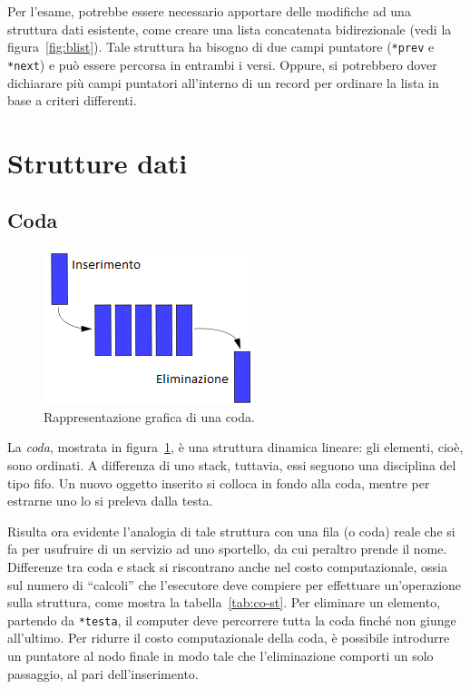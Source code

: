 Per l'esame, potrebbe essere necessario apportare delle modifiche ad una struttura dati esistente, come creare una lista concatenata bidirezionale (vedi la figura~\ref{fig:blist}).
Tale struttura ha bisogno di due campi puntatore (\lstinline!*prev! e \lstinline!*next!) e può essere percorsa in entrambi i versi.
Oppure, si potrebbero dover dichiarare più campi puntatori all'interno di un record per ordinare la lista in base a criteri differenti.

	\section{Strutture dati}

		\subsection{Coda}
		\label{subsec:coda}

\begin{figure}
	\centering
\includegraphics[width=0.45\columnwidth]{immagini/coda}
	\caption[Coda]{Rappresentazione grafica di una coda.}
	\label{fig:coda}
\end{figure}
La \emph{coda}, mostrata in figura~\ref{fig:coda}, è una struttura dinamica lineare: gli elementi, cioè, sono ordinati.
A differenza di uno stack, tuttavia, essi seguono una disciplina del tipo \ac{fifo}.
Un nuovo oggetto inserito si colloca in fondo alla coda, mentre per estrarne uno lo si preleva dalla testa.

Risulta ora evidente l'analogia di tale struttura con una fila (o coda) reale che si fa per usufruire di un servizio ad uno sportello, da cui peraltro prende il nome.
Differenze tra coda e stack si riscontrano anche nel costo computazionale, ossia sul numero di ``calcoli'' che l'esecutore deve compiere per effettuare un'operazione sulla struttura, come mostra la tabella~\ref{tab:co-st}.
Per eliminare un elemento, partendo da \lstinline!*testa!, il computer deve percorrere tutta la coda finché non giunge all'ultimo.
Per ridurre il costo computazionale della coda, è possibile introdurre un puntatore al nodo finale in modo tale che l'eliminazione comporti un solo passaggio, al pari dell'inserimento.


